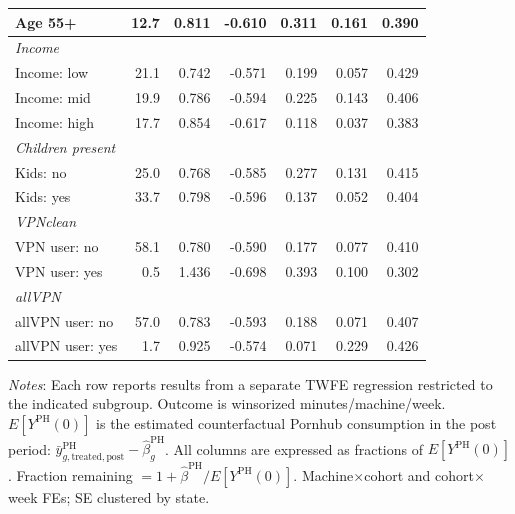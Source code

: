 \begin{landscape}
\begin{table}[htbp]
\begin{tabular}{lrr rrrr}
Age 55+ & 12.7 & 0.811 & -0.610 & 0.311 & 0.161 & 0.390 \\
\midrule
\multicolumn{7}{l}{\textit{Income}} \\
Income: low & 21.1 & 0.742 & -0.571 & 0.199 & 0.057 & 0.429 \\
Income: mid & 19.9 & 0.786 & -0.594 & 0.225 & 0.143 & 0.406 \\
Income: high & 17.7 & 0.854 & -0.617 & 0.118 & 0.037 & 0.383 \\
\midrule
\multicolumn{7}{l}{\textit{Children present}} \\
Kids: no & 25.0 & 0.768 & -0.585 & 0.277 & 0.131 & 0.415 \\
Kids: yes & 33.7 & 0.798 & -0.596 & 0.137 & 0.052 & 0.404 \\
\midrule
\multicolumn{7}{l}{\textit{VPNclean}} \\
VPN user: no & 58.1 & 0.780 & -0.590 & 0.177 & 0.077 & 0.410 \\
VPN user: yes & 0.5 & 1.436 & -0.698 & 0.393 & 0.100 & 0.302 \\
\midrule
\multicolumn{7}{l}{\textit{allVPN}} \\
allVPN user: no & 57.0 & 0.783 & -0.593 & 0.188 & 0.071 & 0.407 \\
allVPN user: yes & 1.7 & 0.925 & -0.574 & 0.071 & 0.229 & 0.426 \\
\bottomrule
\end{tabular}
\vspace{4pt}
\begin{minipage}{\linewidth}\footnotesize
\textit{Notes}: Each row reports results from a separate TWFE regression restricted to the indicated subgroup. Outcome is winsorized minutes/machine/week. $E[Y^{\text{PH}}(0)]$ is the estimated counterfactual Pornhub consumption in the post period: $\bar{y}^{\text{PH}}_{g,\text{treated},\text{post}} - \hat{\beta}^{\text{PH}}_g$. All columns are expressed as fractions of $E[Y^{\text{PH}}(0)]$. Fraction remaining $= 1 + \hat{\beta}^{\text{PH}}/E[Y^{\text{PH}}(0)]$. Machine$\times$cohort and cohort$\times$week FEs; SE clustered by state.
\end{minipage}
\end{table}
\end{landscape}
